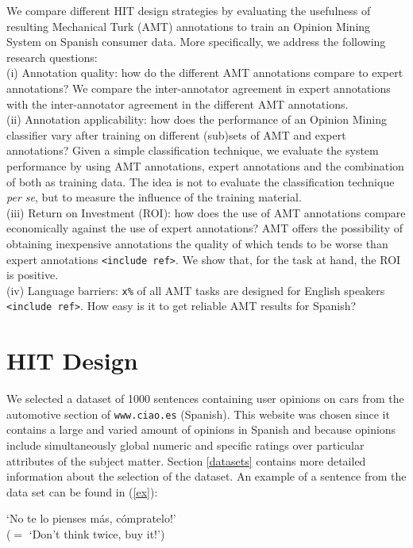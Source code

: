 \documentclass[11pt,letterpaper]{article}
\begin{document}
We compare different HIT design strategies by evaluating the usefulness of resulting Mechanical Turk (AMT) annotations to train an Opinion Mining System on Spanish consumer data. More specifically, we address the following research questions:\\
 \indent (i) Annotation quality: how do the different AMT annotations compare to expert annotations? We compare the inter-annotator agreement in expert annotations with the inter-annotator agreement in the different AMT annotations.\\
 \indent (ii) Annotation applicability: how does the performance of an Opinion Mining classifier vary after training on different (sub)sets of AMT and expert annotations? Given a simple classification technique, we evaluate the system performance by using AMT annotations, expert annotations and the combination of both as training data. The idea is not to evaluate the classification technique \textit{per se}, but to measure the influence of the training material.\\
 \indent (iii) Return on Investment (ROI): how does the use of AMT annotations compare economically against the use of expert annotations? AMT offers the possibility of obtaining inexpensive annotations the quality of which tends to be worse than expert annotations \texttt{<include ref>}. We show that, for the task at hand, the ROI is positive.\\
 \indent (iv) Language barriers: \texttt{x\%} of all AMT tasks are designed for English speakers \texttt{<include ref>}. How easy is it to get reliable AMT results for Spanish? 

\section{HIT Design}
\label{sect:design}

We selected a dataset of 1000 sentences containing user opinions on cars from the automotive section of \texttt{www.ciao.es} (Spanish). This website was chosen since it contains a large and varied amount of opinions in Spanish and because opinions include simultaneously global numeric and specific ratings over particular attributes of the subject matter. Section \ref{datasets} contains more detailed information about the selection of the dataset. An example of a sentence from the data set can be found in (\ref{ex}):

\begin{li}
  \label{ex}
  `No te lo pienses m\'{a}s, c\'{o}mpratelo!'\\
  ($=$ `Don't think twice, buy it!')
\end{li}
\end{document}
